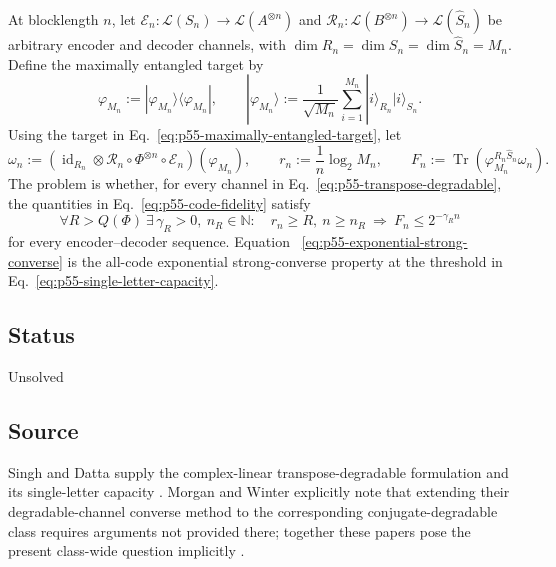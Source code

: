 At blocklength $n$, let
$\mathcal E_n:\mathcal L(S_n)\to\mathcal L(A^{\otimes n})$ and
$\mathcal R_n:\mathcal L(B^{\otimes n})\to\mathcal L(\widehat S_n)$ be
arbitrary encoder and decoder channels, with
$\dim R_n=\dim S_n=\dim\widehat S_n=M_n$.  Define the maximally entangled
target by
\begin{equation}
  \varphi_{M_n}:=
  |\varphi_{M_n}\rangle\!\langle\varphi_{M_n}|,
  \qquad
  |\varphi_{M_n}\rangle
  :=\frac1{\sqrt{M_n}}\sum_{i=1}^{M_n}|i\rangle_{R_n}|i\rangle_{S_n}.
  \label{eq:p55-maximally-entangled-target}
\end{equation}
Using the target in Eq.~\eqref{eq:p55-maximally-entangled-target}, let
\begin{equation}
  \omega_n:=
  \left(\operatorname{id}_{R_n}\otimes
  \mathcal R_n\circ\Phi^{\otimes n}\circ\mathcal E_n\right)(\varphi_{M_n}),
  \qquad
  r_n:=\frac1n\log_2M_n,
  \qquad
  F_n:=\operatorname{Tr}(\varphi_{M_n}^{R_n\widehat S_n}\omega_n).
  \label{eq:p55-code-fidelity}
\end{equation}
The problem is whether, for every channel in
Eq.~\eqref{eq:p55-transpose-degradable}, the quantities in
Eq.~\eqref{eq:p55-code-fidelity} satisfy
\begin{equation}
  \forall R>Q(\Phi)\ \exists\,\gamma_R>0,\ n_R\in\mathbb N:
  \quad
  r_n\geq R,\ n\geq n_R
  \ \Longrightarrow\
  F_n\leq2^{-\gamma_R n}
  \label{eq:p55-exponential-strong-converse}
\end{equation}
for every encoder--decoder sequence.  Equation~
\eqref{eq:p55-exponential-strong-converse} is the all-code exponential
strong-converse property at the threshold in
Eq.~\eqref{eq:p55-single-letter-capacity}.

\subsection*{Status}

Unsolved

\subsection*{Source}

Singh and Datta supply the complex-linear transpose-degradable formulation and
its single-letter capacity
.  Morgan and Winter explicitly note
that extending their degradable-channel converse method to the corresponding
conjugate-degradable class requires arguments not provided there; together
these papers pose the present class-wide question implicitly
.

